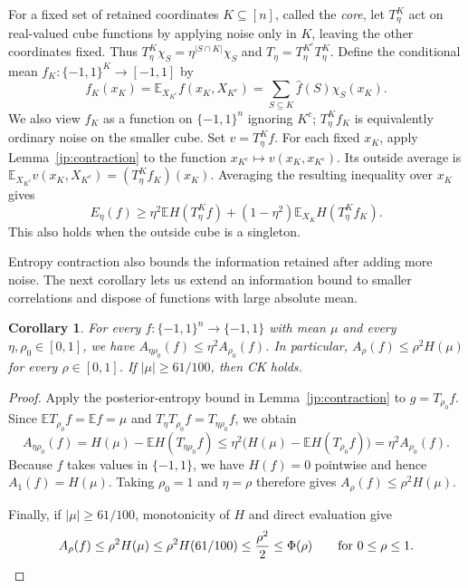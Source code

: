 \documentclass[11pt,letterpaper]{amsart}
\newcommand{\E}{\mathbb E}
\newcommand{\1}{\mathbf 1}
\newtheorem{corollary}[theorem]{Corollary}
\numberwithin{equation}{section}
\begin{document}
For a fixed set of retained coordinates $K\subseteq[n]$, called the
\emph{core}, let $T_\eta^K$ act on real-valued cube functions by applying
noise only in $K$, leaving the other coordinates fixed. Thus
$T_\eta^K\chi_S=\eta^{|S\cap K|}\chi_S$ and
$T_\eta=T_\eta^{K^c}T_\eta^K$.
Define the conditional mean $f_K:\{-1,1\}^K\to[-1,1]$ by
\[
 f_K(x_K)=\E_{X_{K^c}}f(x_K,X_{K^c})
         =\sum_{S\subseteq K}\widehat f(S)\chi_S(x_K).
\]
We also view $f_K$ as a function on $\{-1,1\}^n$ ignoring $K^c$;
$T_\eta^K f_K$ is equivalently ordinary noise on the smaller cube.
Set $v=T_\eta^K f$. For each fixed $x_K$, apply
Lemma~\ref{jp:contraction} to the function
$x_{K^c}\mapsto v(x_K,x_{K^c})$. Its outside average is
$\E_{X_{K^c}}v(x_K,X_{K^c})=(T_\eta^K f_K)(x_K)$.
Averaging the resulting inequality over $x_K$ gives
\begin{equation}\label{jp:core-contraction}
 E_\eta(f)\ge \eta^2\E H(T_\eta^K f)
 +(1-\eta^2)\E_{X_K}H(T_\eta^K f_K).
\end{equation}
This also holds when the outside cube is a singleton.

Entropy contraction also bounds the information retained after adding
more noise. The next corollary lets us extend an information bound to
smaller correlations and dispose of functions with large absolute mean.

\begin{corollary}
\label{ub:information-contraction}
For every $f:\{-1,1\}^n\to\{-1,1\}$ with mean $\mu$
and every $\eta,\rho_0\in[0,1]$,
we have $A_{\eta\rho_0}(f)\le\eta^2 A_{\rho_0}(f)$.
In particular, $A_\rho(f)\le\rho^2H(\mu)$
for every $\rho\in[0,1]$.
If $|\mu|\ge61/100$, then
CK holds.
\end{corollary}

\begin{proof}
Apply the posterior-entropy bound in
Lemma~\ref{jp:contraction} to $g=T_{\rho_0}f$.
Since $\E T_{\rho_0}f=\E f =\mu$ and
$T_\eta T_{\rho_0}f=T_{\eta\rho_0}f$, we obtain
\[
 A_{\eta\rho_0}(f)
 =H(\mu)-\E H(T_{\eta\rho_0}f)\le\eta^2\bigl(H(\mu)-\E H(T_{\rho_0}f)\bigr)
 =\eta^2 A_{\rho_0}(f).
\]
Because $f$ takes values in $\{-1,1\}$, we have $H(f)=0$
pointwise and hence $A_1(f)=H(\mu)$.
Taking $\rho_0=1$ and $\eta=\rho$ therefore gives
$A_\rho(f)\le\rho^2H(\mu)$.

Finally, if $|\mu|\ge61/100$, monotonicity of $H$ and
direct evaluation give
\[
 A_\rho(f)\le\rho^2H(\mu)
 \le\rho^2H(61/100)\le\frac{\rho^2}{2}\le\Phi(\rho)
 \qquad \text{for } 0\le\rho\le1. \qedhere
\]
\end{proof}
\end{document}
